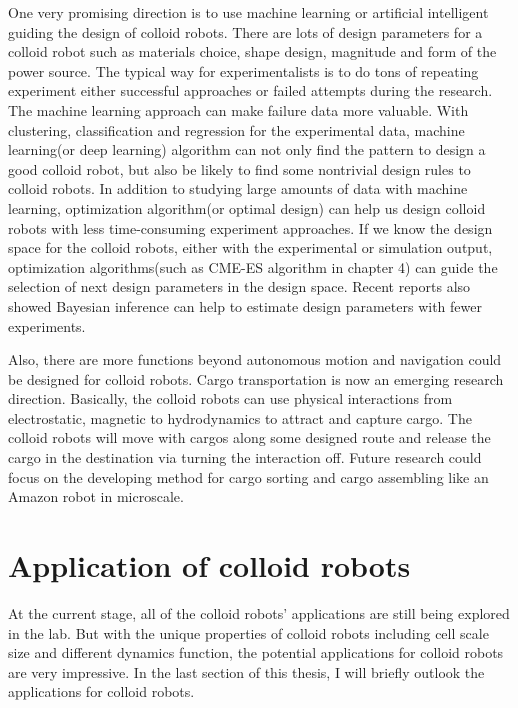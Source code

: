 One very promising  direction is to use machine learning or artificial intelligent guiding the design of colloid robots. There are lots of design parameters for a colloid robot such as materials choice, shape design, magnitude and form of the power source. The typical way for experimentalists is to do tons of repeating experiment either successful approaches or failed attempts during the research. The machine learning approach can make failure data more valuable. With clustering, classification and regression for the experimental data, machine learning(or deep learning) algorithm can not only find the pattern to design a good colloid robot, but also be likely to find some nontrivial design rules to colloid robots. In addition to studying large amounts of data with machine learning, optimization algorithm(or optimal design) can help us design colloid robots with less time-consuming experiment approaches. If we know the design space for the colloid robots, either with the experimental or simulation output, optimization algorithms(such as CME-ES algorithm in chapter 4) can guide the selection of next design parameters in the design space. Recent reports also showed Bayesian inference can help to estimate design parameters with fewer experiments. \cite{winslow2019characterization}



Also, there are more functions beyond autonomous motion and navigation could be designed for colloid robots. Cargo transportation is now an emerging research direction.\cite{demirors2018active,Martinez-Pedrero2015} Basically, the colloid robots can use physical interactions from electrostatic, magnetic to hydrodynamics to attract and capture cargo. The colloid robots will move with cargos along some designed route and release the cargo in the destination via turning the interaction off. Future research could focus  on the developing method for cargo sorting and cargo assembling like an Amazon robot in microscale.


\section{Application of colloid robots}
At the current stage, all of the colloid robots' applications are still being explored in the lab. But with the unique properties of colloid robots including cell scale size and different dynamics function, the potential applications for colloid robots are very impressive. In the last section of this thesis, I will briefly outlook the applications for colloid robots.

